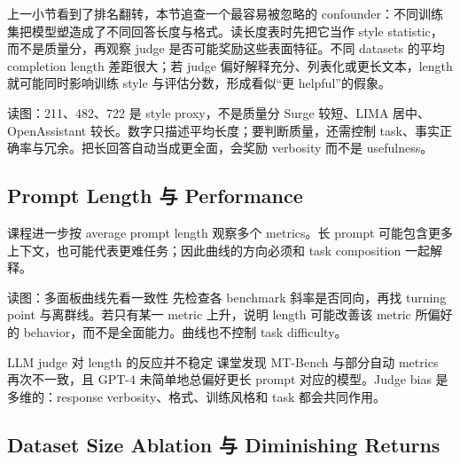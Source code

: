 上一小节看到了排名翻转，本节追查一个最容易被忽略的 confounder：不同训练集把模型塑造成了不同回答长度与格式。读长度表时先把它当作 style statistic，而不是质量分，再观察 judge 是否可能奖励这些表面特征。不同 datasets 的平均 completion length 差距很大；若 judge 偏好解释充分、列表化或更长文本，length 就可能同时影响训练 style 与评估分数，形成看似“更 helpful”的假象。


\begin{knowledgebox}{读图：211、482、722 是 style proxy，不是质量分}
Surge 较短、LIMA 居中、OpenAssistant 较长。数字只描述平均长度；要判断质量，还需控制 task、事实正确率与冗余。把长回答自动当成更全面，会奖励 verbosity 而不是 usefulness。
\end{knowledgebox}

\subsection{Prompt Length 与 Performance}

课程进一步按 average prompt length 观察多个 metrics。长 prompt 可能包含更多上下文，也可能代表更难任务；因此曲线的方向必须和 task composition 一起解释。


\begin{knowledgebox}{读图：多面板曲线先看一致性}
先检查各 benchmark 斜率是否同向，再找 turning point 与离群线。若只有某一 metric 上升，说明 length 可能改善该 metric 所偏好的 behavior，而不是全面能力。曲线也不控制 task difficulty。
\end{knowledgebox}


\begin{warningbox}{LLM judge 对 length 的反应并不稳定}
课堂发现 MT-Bench 与部分自动 metrics 再次不一致，且 GPT-4 未简单地总偏好更长 prompt 对应的模型。Judge bias 是多维的：response verbosity、格式、训练风格和 task 都会共同作用。
\end{warningbox}

\subsection{Dataset Size Ablation 与 Diminishing Returns}

